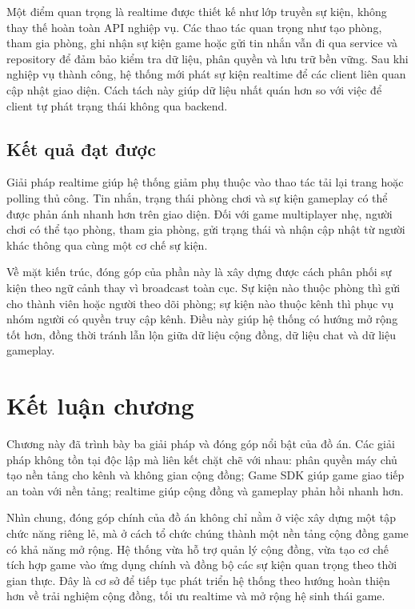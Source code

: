 \documentclass[../DoAn.tex]{subfiles}
\begin{document}
Một điểm quan trọng là realtime được thiết kế như lớp truyền sự kiện, không thay thế hoàn toàn API nghiệp vụ. Các thao tác quan trọng như tạo phòng, tham gia phòng, ghi nhận sự kiện game hoặc gửi tin nhắn vẫn đi qua service và repository để đảm bảo kiểm tra dữ liệu, phân quyền và lưu trữ bền vững. Sau khi nghiệp vụ thành công, hệ thống mới phát sự kiện realtime để các client liên quan cập nhật giao diện. Cách tách này giúp dữ liệu nhất quán hơn so với việc để client tự phát trạng thái không qua backend.

\subsection{Kết quả đạt được}
\label{subsection:5.3.3}

Giải pháp realtime giúp hệ thống giảm phụ thuộc vào thao tác tải lại trang hoặc polling thủ công. Tin nhắn, trạng thái phòng chơi và sự kiện gameplay có thể được phản ánh nhanh hơn trên giao diện. Đối với game multiplayer nhẹ, người chơi có thể tạo phòng, tham gia phòng, gửi trạng thái và nhận cập nhật từ người khác thông qua cùng một cơ chế sự kiện.

Về mặt kiến trúc, đóng góp của phần này là xây dựng được cách phân phối sự kiện theo ngữ cảnh thay vì broadcast toàn cục. Sự kiện nào thuộc phòng thì gửi cho thành viên hoặc người theo dõi phòng; sự kiện nào thuộc kênh thì phục vụ nhóm người có quyền truy cập kênh. Điều này giúp hệ thống có hướng mở rộng tốt hơn, đồng thời tránh lẫn lộn giữa dữ liệu cộng đồng, dữ liệu chat và dữ liệu gameplay.

\section{Kết luận chương}
\label{section:5.4}

Chương này đã trình bày ba giải pháp và đóng góp nổi bật của đồ án. Các giải pháp không tồn tại độc lập mà liên kết chặt chẽ với nhau: phân quyền máy chủ tạo nền tảng cho kênh và không gian cộng đồng; Game SDK giúp game giao tiếp an toàn với nền tảng; realtime giúp cộng đồng và gameplay phản hồi nhanh hơn.

Nhìn chung, đóng góp chính của đồ án không chỉ nằm ở việc xây dựng một tập chức năng riêng lẻ, mà ở cách tổ chức chúng thành một nền tảng cộng đồng game có khả năng mở rộng. Hệ thống vừa hỗ trợ quản lý cộng đồng, vừa tạo cơ chế tích hợp game vào ứng dụng chính và đồng bộ các sự kiện quan trọng theo thời gian thực. Đây là cơ sở để tiếp tục phát triển hệ thống theo hướng hoàn thiện hơn về trải nghiệm cộng đồng, tối ưu realtime và mở rộng hệ sinh thái game.
\end{document}
